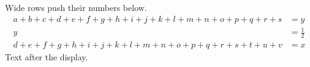 \documentclass{article}
\begin{document}
Wide rows push their numbers below.
\begin{align}
a+b+c+d+e+f+g+h+i+j+k+l+m+n+o+p+q+r+s &= y \\
y &= \frac{1}{2} \\
d+e+f+g+h+i+j+k+l+m+n+o+p+q+r+s+t+u+v &= x
\end{align}
Text after the display.
\end{document}
